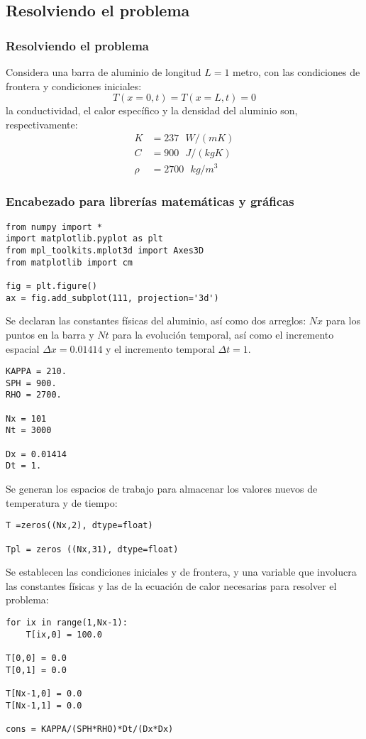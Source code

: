 \subsection{Resolviendo el problema}
\begin{frame}
\frametitle{Resolviendo el problema}
Considera una barra de aluminio de longitud $L=1$ metro, con las condiciones de frontera y condiciones iniciales:
\[  T(x=0,t) = T(x=L,t) = 0 \]
la conductividad, el calor específico y la densidad del aluminio son, respectivamente:
\begin{align*}
	K &= 237 \mbox{ } W/(mK) \\
	C &= 900 \mbox{ } J/(kg K) \\
	\rho &= 2700 \mbox{ } kg/m^{3}
\end{align*}
\end{frame}
\begin{frame}[fragile]
\frametitle{Encabezado para librerías matemáticas y gráficas}
\begin{lstlisting}
from numpy import *
import matplotlib.pyplot as plt
from mpl_toolkits.mplot3d import Axes3D
from matplotlib import cm

fig = plt.figure()
ax = fig.add_subplot(111, projection='3d')
\end{lstlisting}
\end{frame}
\begin{frame}[fragile]
Se declaran las constantes físicas del aluminio, así como dos arreglos: $Nx$ para los puntos en la barra y $Nt$ para la evolución temporal, así como el incremento espacial $\Delta x = 0.01414$ y el incremento temporal $\Delta t= 1$.
\begin{lstlisting}
KAPPA = 210.
SPH = 900.
RHO = 2700.

Nx = 101
Nt = 3000

Dx = 0.01414
Dt = 1.
\end{lstlisting}
\end{frame}
\begin{frame}[fragile]
Se generan los espacios de trabajo para almacenar los valores nuevos de temperatura y de tiempo:
\begin{lstlisting}
T =zeros((Nx,2), dtype=float)

Tpl = zeros ((Nx,31), dtype=float)
\end{lstlisting}
\end{frame}
\begin{frame}[fragile]
Se establecen las condiciones iniciales y de frontera, y una variable que involucra las constantes físicas y las de la ecuación de calor necesarias para resolver el problema:
\begin{lstlisting}
for ix in range(1,Nx-1):
    T[ix,0] = 100.0

T[0,0] = 0.0
T[0,1] = 0.0

T[Nx-1,0] = 0.0
T[Nx-1,1] = 0.0

cons = KAPPA/(SPH*RHO)*Dt/(Dx*Dx)
\end{lstlisting}
\end{frame}
